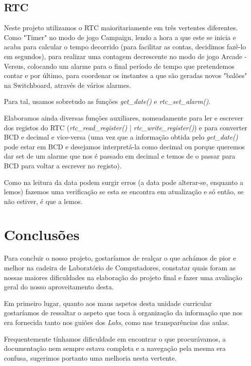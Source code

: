 \documentclass{report}
\begin{document}
\section{RTC}

Neste projeto utilizamos o RTC maioritariamente em três vertentes diferentes. Como "Timer" no modo de jogo Campaign, lendo a hora a que este se inicia e acaba para calcular o tempo decorrido (para facilitar as contas, decidimos fazê-lo em segundos), para realizar uma contagem decrescente no modo de jogo Arcade - Versus, colocando um alarme para o final período de tempo que pretendemos contar e por último, para coordenar os instantes a que são geradas novos "balões" na Switchboard, através de vários alarmes.

Para tal, usamos sobretudo as funções \textit{get\_date()} e \textit{rtc\_set\_alarm()}.

Elaboramos ainda diversas funções auxiliares, nomeadamente para ler e escrever dos registos do RTC (\textit{rtc\_read\_register()} | \textit{rtc\_write\_register()}) e para converter BCD e decimal e vice-versa (uma vez que a informação obtida pelo \textit{get\_date()} pode estar em BCD e desejamos interpretá-la como decimal ou porque queremos dar set de um alarme que nos é passado em decimal e temos de o passar para BCD para voltar a escrever no registo).

Como na leitura da data podem surgir erros (a data pode alterar-se, enquanto a lemos) fazemos uma verificação se esta se encontra em atualização e só então, se não estiver, é que a lemos.

\chapter{Conclusões}

Para concluir o nosso projeto, gostaríamos de realçar o que achámos de pior e melhor na cadeira de Laboratório de Computadores, constatar quais foram as nossas maiores dificuldades na elaboração do projeto final e fazer uma avaliação geral do nosso aproveitamento desta.

Em primeiro lugar, quanto aos maus aspetos desta unidade curricular gostaríamos de ressaltar o aspeto que toca à organização da informação que nos era fornecida tanto nos guiões dos \textit{Labs}, como nas transparências das aulas. 

Frequentemente tínhamos dificuldade em encontrar o que procurávamos, a documentação nem sempre estava completa e a navegação pela mesma era confusa, sugerimos portanto uma melhoria nesta vertente.
\end{document}
